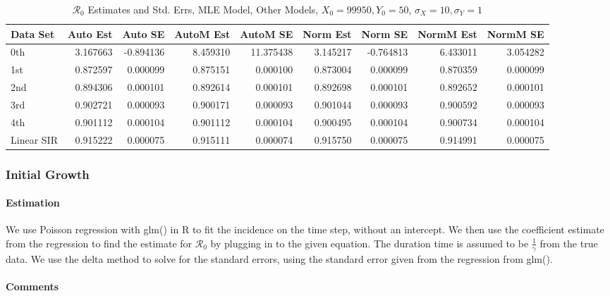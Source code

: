 \documentclass[12pt]{article}
\newcommand{\rr}{\ensuremath{\mathcal{R}_0}}
\begin{document}
\begin{table}[H]
	
	\caption{$\rr$ Estimates and Std. Errs, MLE Model,
		Other Models, $X_0 = 99950, Y_0 = 50$, 
		$\sigma_X = 10, \sigma_Y = 1$}
	\begin{footnotesize}
		\hskip -1cm
		\begin{tabular}{l|r|r|r|r|r|r|r|r}
			\hline
			Data Set & Auto Est & Auto SE & AutoM Est & AutoM SE & Norm Est & Norm SE & NormM Est & NormM SE\\
			\hline
			0th & 3.167663 & -0.894136 & 8.459310 & 11.375438 & 3.145217 & -0.764813 & 6.433011 & 3.054282\\
			\hline
			1st & 0.872597 & 0.000099 & 0.875151 & 0.000100 & 0.873004 & 0.000099 & 0.870359 & 0.000099\\
			\hline
			2nd & 0.894306 & 0.000101 & 0.892614 & 0.000101 & 0.892698 & 0.000101 & 0.892652 & 0.000101\\
			\hline
			3rd & 0.902721 & 0.000093 & 0.900171 & 0.000093 & 0.901044 & 0.000093 & 0.900592 & 0.000093\\
			\hline
			4th & 0.901112 & 0.000104 & 0.901112 & 0.000104 & 0.900495 & 0.000104 & 0.900734 & 0.000104\\
			\hline
			Linear SIR & 0.915222 & 0.000075 & 0.915111 & 0.000074 & 0.915750 & 0.000075 & 0.914991 & 0.000075\\
			\hline
		\end{tabular}
	\end{footnotesize}
\end{table}

\subsubsection{Initial Growth}

\paragraph{Estimation}

We use Poisson regression with glm() in R to fit the incidence on the time step, without an intercept. We then use the coefficient estimate from the regression to find the estimate for $\rr$ by plugging in to the given equation. The duration time is assumed to be $\frac{1}{\gamma}$ from the true data. We use the delta method to solve for the standard errors, using the standard error given from the regression from glm().

\paragraph{Comments}
\end{document}
